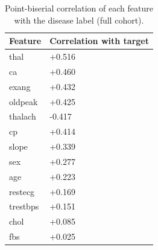\begin{table}[t]
\centering
\caption{Point-biserial correlation of each feature with the disease label (full cohort).}
\label{tab:featstats}
\small
\begin{tabular}{ll}
\toprule
Feature & Correlation with target \\
\midrule
thal & +0.516 \\
ca & +0.460 \\
exang & +0.432 \\
oldpeak & +0.425 \\
thalach & -0.417 \\
cp & +0.414 \\
slope & +0.339 \\
sex & +0.277 \\
age & +0.223 \\
restecg & +0.169 \\
trestbps & +0.151 \\
chol & +0.085 \\
fbs & +0.025 \\
\bottomrule
\end{tabular}
\end{table}
